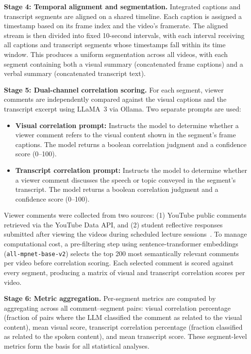 \documentclass[fleqn,10pt]{wlscirep}
\begin{document}
\textbf{Stage 4: Temporal alignment and segmentation.}
Integrated captions and transcript segments are aligned on a shared timeline. Each caption is assigned a timestamp based on its frame index and the video's framerate. The aligned stream is then divided into fixed 10-second intervals, with each interval receiving all captions and transcript segments whose timestamps fall within its time window. This produces a uniform segmentation across all videos, with each segment containing both a visual summary (concatenated frame captions) and a verbal summary (concatenated transcript text).

\textbf{Stage 5: Dual-channel correlation scoring.}
For each segment, viewer comments are independently compared against the visual captions and the transcript excerpt using LLaMA~3 via Ollama. Two separate prompts are used:

\begin{itemize}
    \item \textbf{Visual correlation prompt:} Instructs the model to determine whether a viewer comment refers to the visual content shown in the segment's frame captions. The model returns a boolean correlation judgment and a confidence score (0--100).
    \item \textbf{Transcript correlation prompt:} Instructs the model to determine whether a viewer comment discusses the speech or topic conveyed in the segment's transcript. The model returns a boolean correlation judgment and a confidence score (0--100).
\end{itemize}

Viewer comments were collected from two sources: (1) YouTube public comments retrieved via the YouTube Data API, and (2) student reflective responses submitted after viewing the videos during scheduled lecture sessions~\cite{zhang2025transcript}. To manage computational cost, a pre-filtering step using sentence-transformer embeddings (\texttt{all-mpnet-base-v2}) selects the top 200 most semantically relevant comments per video before correlation scoring. Each selected comment is scored against every segment, producing a matrix of visual and transcript correlation scores per video.

\textbf{Stage 6: Metric aggregation.}
Per-segment metrics are computed by aggregating across all comment--segment pairs: visual correlation percentage (fraction of pairs where the LLM classified the comment as related to the visual content), mean visual score, transcript correlation percentage (fraction classified as related to the spoken content), and mean transcript score. These segment-level metrics form the basis for all statistical analyses.
\end{document}
